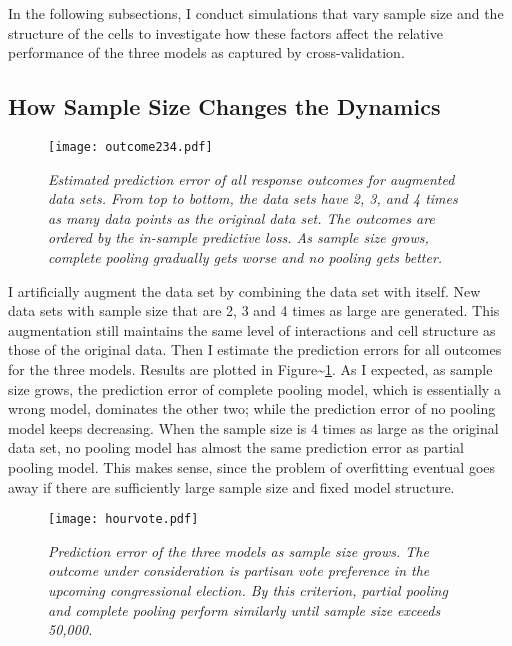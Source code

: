 In the following subsections, I conduct simulations that vary sample
size and the structure of the cells to investigate how these factors
affect the relative performance of the three models as captured by
cross-validation.

\subsection{How Sample Size Changes the
Dynamics}\label{how-sample-size-changes-the-dynamics}

\begin{figure}[p!]
  \centering
  \texttt{[image: outcome234.pdf]}
  \caption{\em Estimated prediction error of all response outcomes for augmented
    data sets. From top to bottom, the data sets have 2, 3, and 4 times as many
    data points as the original data set. The outcomes are ordered by the
    in-sample predictive loss. As sample size grows, complete pooling
    gradually gets worse and no pooling gets better.}
  \label{fig:figx234}
  \end{figure}

I artificially augment the data set by combining the data set with
itself. New data sets with sample size that are 2, 3 and 4 times as
large are generated. This augmentation still maintains the same level of
interactions and cell structure as those of the original data. Then I
estimate the prediction errors for all outcomes for the three models.
Results are plotted in Figure\textasciitilde{}\ref{fig:figx234}. As I
expected, as sample size grows, the prediction error of complete pooling
model, which is essentially a wrong model, dominates the other two;
while the prediction error of no pooling model keeps decreasing. When
the sample size is 4 times as large as the original data set, no pooling
model has almost the same prediction error as partial pooling model.
This makes sense, since the problem of overfitting eventual goes away if
there are sufficiently large sample size and fixed model structure.

\begin{figure*}[p!]
  \centering
  \texttt{[image: hourvote.pdf]}
  \caption{\em Prediction error of the three models as sample size grows. The
    outcome under consideration is partisan vote preference in the upcoming
    congressional election. By this criterion, partial pooling and complete
    pooling perform similarly until sample size exceeds 50,000.}
  \label{fig:hourvote}
\end{figure*}

